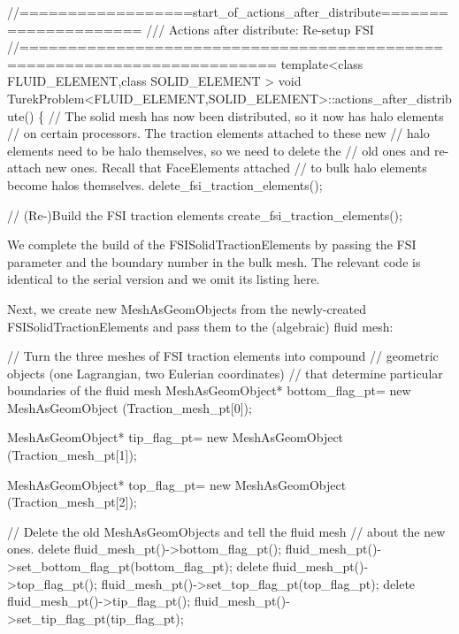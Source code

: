  
\begin{DoxyCodeInclude}
\textcolor{comment}{//==================start\_of\_actions\_after\_distribute=====================}
\textcolor{comment}{///  Actions after distribute: Re-setup FSI}
\textcolor{comment}{}\textcolor{comment}{//========================================================================}
\textcolor{keyword}{template}<\textcolor{keyword}{class} FLUID\_ELEMENT,\textcolor{keyword}{class} SOLID\_ELEMENT >
\textcolor{keywordtype}{void} TurekProblem<FLUID\_ELEMENT,SOLID\_ELEMENT>::actions\_after\_distribute()
\{
 \textcolor{comment}{// The solid mesh has now been distributed, so it now has halo elements}
 \textcolor{comment}{// on certain processors. The traction elements attached to these new}
 \textcolor{comment}{// halo elements need to be halo themselves, so we need to delete the}
 \textcolor{comment}{// old ones and re-attach new ones. Recall that FaceElements attached}
 \textcolor{comment}{// to bulk halo elements become halos themselves.}
 delete\_fsi\_traction\_elements();

 \textcolor{comment}{// (Re-)Build the FSI traction elements}
 create\_fsi\_traction\_elements();

\end{DoxyCodeInclude}


We complete the build of the {\ttfamily F\+S\+I\+Solid\+Traction\+Elements} by passing the F\+SI parameter and the boundary number in the bulk mesh. The relevant code is identical to the serial version and we omit its listing here.

Next, we create new {\ttfamily Mesh\+As\+Geom\+Objects} from the newly-\/created {\ttfamily F\+S\+I\+Solid\+Traction\+Elements} and pass them to the (algebraic) fluid mesh\+:


\begin{DoxyCodeInclude}
 \textcolor{comment}{// Turn the three meshes of FSI traction elements into compound}
 \textcolor{comment}{// geometric objects (one Lagrangian, two Eulerian coordinates)}
 \textcolor{comment}{// that determine particular boundaries of the fluid mesh}
 MeshAsGeomObject*
  bottom\_flag\_pt=
  \textcolor{keyword}{new} MeshAsGeomObject
  (Traction\_mesh\_pt[0]);
 
 MeshAsGeomObject* tip\_flag\_pt=
  \textcolor{keyword}{new} MeshAsGeomObject
  (Traction\_mesh\_pt[1]);
 
 MeshAsGeomObject* top\_flag\_pt=
  \textcolor{keyword}{new} MeshAsGeomObject
  (Traction\_mesh\_pt[2]);


 \textcolor{comment}{// Delete the old MeshAsGeomObjects and tell the fluid mesh }
 \textcolor{comment}{// about the new ones.}
 \textcolor{keyword}{delete} fluid\_mesh\_pt()->bottom\_flag\_pt();
 fluid\_mesh\_pt()->set\_bottom\_flag\_pt(bottom\_flag\_pt);
 \textcolor{keyword}{delete} fluid\_mesh\_pt()->top\_flag\_pt();
 fluid\_mesh\_pt()->set\_top\_flag\_pt(top\_flag\_pt);
 \textcolor{keyword}{delete} fluid\_mesh\_pt()->tip\_flag\_pt();
 fluid\_mesh\_pt()->set\_tip\_flag\_pt(tip\_flag\_pt);

\end{DoxyCodeInclude}


